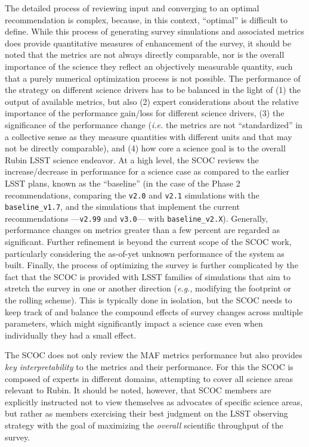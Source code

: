The detailed process of reviewing input and converging to an optimal recommendation is complex, because, in this context, ``optimal'' is difficult to define. While this process of generating survey simulations and associated metrics does provide quantitative measures of enhancement of the survey, it should be noted that the metrics are not always directly comparable, nor is the overall importance of the science they reflect an objectively measurable quantity, such that a purely numerical optimization process is not possible. The performance of the strategy on different science drivers has to be balanced in the light of (1) the output of available metrics, but also (2) expert considerations about the relative importance of the performance gain/loss for different science drivers, (3) the significance of the performance change (\emph{i.e.} the metrics are not ``standardized'' in a collective sense as they measure quantities with different units and that may not be directly comparable), and (4) how core a science goal is to the overall Rubin LSST science endeavor. At a high level, the SCOC reviews the increase/decrease in performance for a science case as compared to the earlier LSST plans, known as the ``baseline'' (in the case of the Phase 2 recommendations, comparing the \texttt{v2.0} and \texttt{v2.1} simulations with the \texttt{baseline\_v1.7}, and  the simulations that implement the current recommendations ---\texttt{v2.99} and \texttt{v3.0}--- with \texttt{baseline\_v2.X}). Generally, performance changes on metrics greater than a few percent are regarded as significant. Further refinement is beyond the current scope of the SCOC work, particularly considering the as-of-yet unknown performance of the system as built. Finally, the process of optimizing the survey is further complicated by the fact that the SCOC is provided with LSST families of simulations that aim to stretch the survey in one or another direction (\emph{e.g.}, modifying the footprint or the rolling scheme). This is typically done in isolation, but the SCOC needs to keep track of and balance the compound effects of survey changes across multiple parameters, which might significantly impact a science case even when individually they had a small effect. 

The SCOC does not only review the MAF metrics performance but also provides \emph{key interpretability} to the metrics and their performance. For this the SCOC is composed of experts in different domains, attempting to cover all science areas relevant to Rubin. It should be noted, however, that SCOC members are explicitly instructed not to view themselves as advocates of specific science areas, but rather as members exercising their best judgment on the LSST observing strategy with the goal of maximizing the \emph{overall} scientific throughput of the survey.

